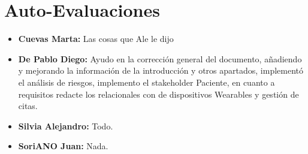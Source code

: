 \documentclass{article}
\begin{document}
\section{Auto-Evaluaciones}
\begin{itemize}
	\item \textbf{Cuevas Marta:} Las cosas que Ale le dijo
	\item \textbf{De Pablo Diego:} Ayudo en la corrección general del documento, añadiendo y mejorando la información de la introducción y otros apartados, implementó el análisis de riesgos, implemento el stakeholder Paciente, en cuanto a requisitos  redacte los relacionales con de dispositivos Wearables y gestión de citas.
	\item \textbf{Silvia Alejandro:} Todo.
	\item \textbf{SoriANO Juan:} Nada.
\end{itemize}
\end{document}

